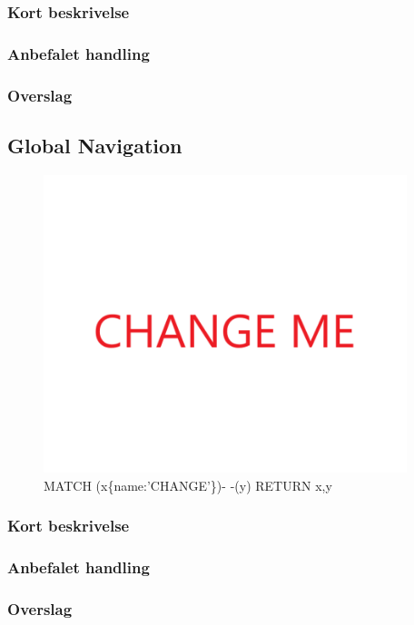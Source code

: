 \documentclass{article}
\begin{document}
\subsubsection{Kort beskrivelse}
\subsubsection{Anbefalet handling}
\subsubsection{Overslag}


\subsection{Global Navigation}
\begin{figure}[h]
\includegraphics[width=300pt]{CHANGE.PNG}
\caption{MATCH (x\{name:'CHANGE'\})- -(y) RETURN x,y}
\end{figure}
\subsubsection{Kort beskrivelse}
\subsubsection{Anbefalet handling}
\subsubsection{Overslag}
\end{document}
